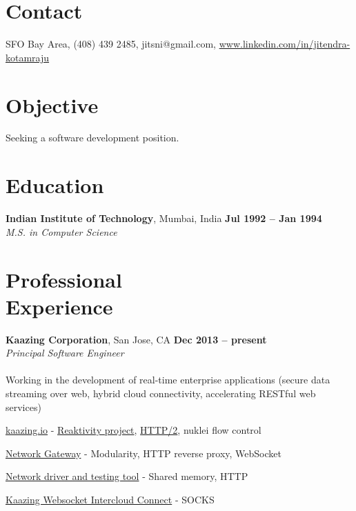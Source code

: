 \documentclass[margin,line]{resume}
\begin{document}
\begin{resume}

\section{\mysidestyle Contact}

SFO Bay Area, (408) 439 2485, jitsni@gmail.com, \href{https://www.linkedin.com/in/jitendra-kotamraju-70b37b}{www.linkedin.com/in/jitendra-kotamraju}


\section{\mysidestyle Objective}

Seeking a software development position.

\section{\mysidestyle Education}

\textbf{Indian Institute of Technology}, Mumbai, India \hfill \textbf{Jul 1992 -- Jan 1994}\\
\textsl{M.S. in Computer Science}


\section{\mysidestyle Professional\\Experience}

    \textbf{Kaazing Corporation}, San Jose, CA \hfill \textbf{Dec 2013 -- present}\\ 
    \textsl{Principal Software Engineer}\\\\
Working in the development of real-time enterprise applications (secure data streaming over web, hybrid cloud connectivity, accelerating RESTful web services) 
    \begin{list2}
    \item \href{https://kaazing.com/kaazingio/}{kaazing.io} - \href{http://reaktivity.org/}{Reaktivity project}, \href{https://github.com/reaktivity/nukleus-http2.java}{HTTP/2}, nuklei flow control
    \item \href{http://github.com/kaazing/gateway}{Network Gateway} - Modularity, HTTP reverse proxy, WebSocket
    \item \href{http://github.com/kaazing/k3po}{Network driver and testing tool} - Shared memory, HTTP
    \item \href{https://kaazing.com/kwic/}{Kaazing Websocket Intercloud Connect} - SOCKS
    \end{list2}\vspace{-1.5mm}


\end{resume}
\end{document}
